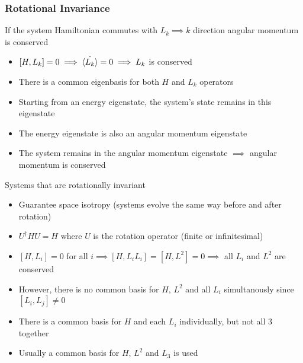 \documentclass[8pt,t,mathserif,aspectratio=169]{beamer}
\begin{document}
\begin{frame}
  \frametitle{Rotational Invariance}
  \vspace{1mm}
  If the system Hamiltonian commutes with $L_k \implies k$ direction angular momentum is conserved 
  \begin{itemize}
    \item $[H,L_k] = 0 \implies \dot{\expval{L_k}} = 0 \implies L_k$ is conserved
    \item There is a common eigenbasis for both $H$ and $L_k$ operators
    \item Starting from an energy eigenstate, the system's state remains in this eigenstate
    \item The energy eigenstate is also an angular momentum eigenstate
    \item The system remains in the angular momentum eigenstate $\implies$ angular momentum is conserved
  \end{itemize}
  Systems that are rotationally invariant 
  \begin{itemize}
    \item Guarantee space isotropy (systems evolve the same way before and after rotation)
    \item $U^{\dagger}HU = H$ where $U$ is the rotation operator (finite or infinitesimal) 
    \item $[H,L_i] = 0$ for all $i \implies [H,L_i L_i] = [H,L^2] = 0 \implies$ all $L_i$ and $L^2$ are conserved
    \item However, there is no common basis for $H$, $L^2$ and all $L_i$ simultanously since $[L_i,L_j] \neq 0$
    \item There is a common basis for $H$ and each $L_i$ individually, but not all $3$ together
    \item Usually a common basis for $H$, $L^2$ and $L_3$ is used
  \end{itemize}
\end{frame}
\end{document}
